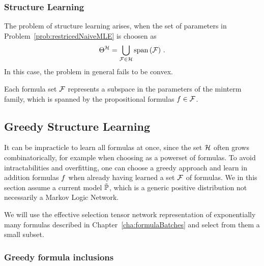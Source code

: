 \subsubsection{Structure Learning}

The problem of structure learning arises, when the set of parameters in Problem~\ref{prob:restricedNaiveMLE} is choosen as 
	\[ \Theta^{\mathcal{H}}= \bigcup_{\mathcal{F}\in\mathcal{H}} \mathrm{span}\left(\mathcal{F}\right) \, .  \] %
In this case, the problem in general fails to be convex.

Each formula set $\mathcal{F}$ represents a subspace in the parameters of the minterm family, which is spanned by the propositional formulas $f\in\mathcal{F}$.








\subsection{Greedy Structure Learning}


It can be impracticle to learn all formulas at once, since the set $\mathcal{H}$ often grows combinatorically, for example when choosing as a powerset of formulas.
To avoid intractabilities and overfitting, one can choose a greedy approach and learn in addition formulas $f$ when already having learned a set $\mathcal{F}$ of formulas.
We in this section assume a current model $\tilde{\mathbb{P}}$, which is a generic positive distribution not necessarily a Markov Logic Network. %

% 
We will use the effective selection tensor network representation of exponentially many formulas described in Chapter~\ref{cha:formulaBatches} and select from them a small subset.



\subsubsection{Greedy formula inclusions}

